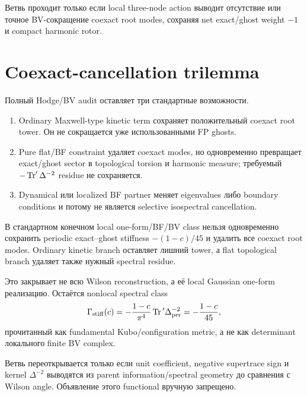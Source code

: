 \begin{nogocriterion}
Ветвь проходит только если local three-node action выводит отсутствие или
точное BV-сокращение coexact root modes, сохраняя net exact/ghost weight
\(-1\) и compact harmonic rotor.
\end{nogocriterion}

\section{Coexact-cancellation trilemma}

Полный Hodge/BV audit оставляет три стандартные возможности.
\begin{enumerate}
 \item Ordinary Maxwell-type kinetic term сохраняет положительный coexact
 root tower. Он не сокращается уже использованными FP ghosts.
 \item Pure flat/BF constraint удаляет coexact modes, но одновременно
 превращает exact/ghost sector в topological torsion и harmonic measure;
 требуемый \(-\operatorname{Tr}'\Delta^{-2}\) residue не сохраняется.
 \item Dynamical или localized BF partner меняет eigenvalues либо boundary
 conditions и потому не является selective isospectral cancellation.
\end{enumerate}

\begin{theorem}
В стандартном конечном local one-form/BF/BV class нельзя одновременно
сохранить periodic exact--ghost stiffness \(-(1-c)/45\) и удалить все
coexact root modes. Ordinary kinetic branch оставляет лишний tower, а flat
topological branch удаляет также нужный spectral residue.
\end{theorem}

Это закрывает не всю Wilson reconstruction, а её local Gaussian one-form
реализацию. Остаётся nonlocal spectral class
\begin{equation}
 \Gamma_{\rm stiff}(c)
 =-\frac{1-c}{\pi^4}\operatorname{Tr}{}'\Delta_{\rm per}^{-2}
 =-\frac{1-c}{45},
\end{equation}
прочитанный как fundamental Kubo/configuration metric, а не как determinant
локального finite BV complex.

\begin{nogocriterion}
Ветвь переоткрывается только если unit coefficient, negative supertrace sign
и kernel \(\Delta^{-2}\) выводятся из parent information/spectral geometry до
сравнения с Wilson angle. Объявление этого functional вручную запрещено.
\end{nogocriterion}

